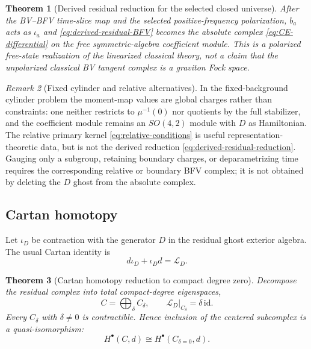 \documentclass[11pt]{article}
\newtheorem{theorem}{Theorem}[section]
\theoremstyle{definition}
\theoremstyle{remark}
\newtheorem{remark}[theorem]{Remark}
\newcommand{\cL}{\mathcal L}
\newcommand{\id}{\mathrm{id}}
\begin{document}
\begin{theorem}[Derived residual reduction for the selected closed universe]
After the BV--BFV time-slice map and the selected positive-frequency
polarization, $b_a$ acts as $\iota_a$ and
\eqref{eq:derived-residual-BFV} becomes the absolute complex
\eqref{eq:CE-differential} on the free symmetric-algebra coefficient module.
This is a polarized free-state realization of the linearized classical
theory, not a
claim that the unpolarized classical BV tangent complex is a graviton Fock
space.
\end{theorem}

\begin{remark}[Fixed cylinder and relative alternatives]
In the fixed-background cylinder problem the moment-map values are global
charges rather than constraints: one neither restricts to $\mu^{-1}(0)$ nor
quotients by the full stabilizer, and the coefficient module remains an
$SO(4,2)$ module with $D$ as Hamiltonian.  The relative primary kernel
\eqref{eq:relative-conditions} is useful representation-theoretic data, but
is not the derived reduction \eqref{eq:derived-residual-reduction}.  Gauging
only a subgroup, retaining boundary charges, or deparametrizing time requires
the corresponding relative or boundary BFV complex; it is not obtained by
deleting the $D$ ghost from the absolute complex.
\end{remark}

\subsection{Cartan homotopy}

Let $\iota_D$ be contraction with the generator $D$ in the residual ghost
exterior algebra.  The usual Cartan identity is
\begin{equation}\label{eq:cartan-identity}
 d\iota_D+\iota_Dd=\cL_D.
\end{equation}

\begin{theorem}[Cartan homotopy reduction to compact degree zero]\label{thm:cartan}
Decompose the residual complex into total compact-degree eigenspaces,
\begin{equation}
 C=\bigoplus_{\delta}C_\delta,
 \qquad \cL_D|_{C_\delta}=\delta\,\id.
\end{equation}
Every $C_\delta$ with $\delta\ne0$ is contractible.  Hence inclusion of the
centered subcomplex is a quasi-isomorphism:
\begin{equation}\label{eq:cartan-quasiiso}
 \boxed{H^\bullet(C,d)\cong H^\bullet(C_{\delta=0},d).}
\end{equation}
\end{theorem}
\end{document}
